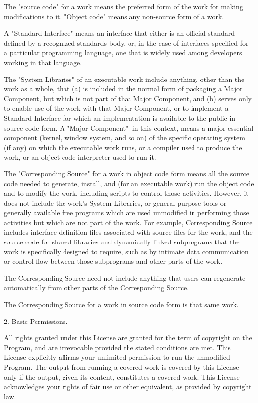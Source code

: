 \documentclass[11pt]{book}
\begin{document}
    The "source code" for a work means the preferred form of the work
    for making modifications to it.  "Object code" means any non-source
    form of a work.

    A "Standard Interface" means an interface that either is an official
    standard defined by a recognized standards body, or, in the case of
    interfaces specified for a particular programming language, one that
    is widely used among developers working in that language.

    The "System Libraries" of an executable work include anything, other
    than the work as a whole, that (a) is included in the normal form of
    packaging a Major Component, but which is not part of that Major
    Component, and (b) serves only to enable use of the work with that
    Major Component, or to implement a Standard Interface for which an
    implementation is available to the public in source code form.  A
    "Major Component", in this context, means a major essential component
    (kernel, window system, and so on) of the specific operating system
    (if any) on which the executable work runs, or a compiler used to
    produce the work, or an object code interpreter used to run it.

    The "Corresponding Source" for a work in object code form means all
    the source code needed to generate, install, and (for an executable
    work) run the object code and to modify the work, including scripts to
    control those activities.  However, it does not include the work's
    System Libraries, or general-purpose tools or generally available free
    programs which are used unmodified in performing those activities but
    which are not part of the work.  For example, Corresponding Source
    includes interface definition files associated with source files for
    the work, and the source code for shared libraries and dynamically
    linked subprograms that the work is specifically designed to require,
    such as by intimate data communication or control flow between those
    subprograms and other parts of the work.

    The Corresponding Source need not include anything that users
    can regenerate automatically from other parts of the Corresponding
    Source.

    The Corresponding Source for a work in source code form is that
    same work.

    2. Basic Permissions.

    All rights granted under this License are granted for the term of
    copyright on the Program, and are irrevocable provided the stated
    conditions are met.  This License explicitly affirms your unlimited
    permission to run the unmodified Program.  The output from running a
    covered work is covered by this License only if the output, given its
    content, constitutes a covered work.  This License acknowledges your
    rights of fair use or other equivalent, as provided by copyright law.
\end{document}
